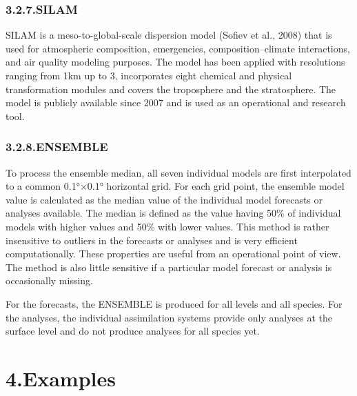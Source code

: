 \documentclass[9pt]{report}
\begin{document}
\subsubsection{3.2.7.\hspace*{0.5em}SILAM}\label{sec-silam}%

\noindent{}SILAM is a meso-to-global-scale dispersion model (Sofiev et al., 2008) that is used for atmospheric composition, emergencies, composition–climate interactions, and air quality modeling purposes. 
The model has been applied with resolutions ranging from 1km up to 3\textdegree{}, incorporates eight chemical and physical transformation modules and covers the troposphere and the stratosphere. 
The model is publicly available since 2007 and is used as an operational and research tool.%

\subsubsection{3.2.8.\hspace*{0.5em}ENSEMBLE}\label{sec-ensemble}%

\noindent{}To process the ensemble median, all seven individual models are first interpolated to a common 0.1°×0.1° horizontal grid. 
For each grid point, the ensemble model value is calculated as the median value of the individual model forecasts or analyses available. 
The median is defined as the value having 50\% of individual models with higher values and 50\% with lower values. 
This method is rather insensitive to outliers in the forecasts or analyses and is very efficient computationally. 
These properties are useful from an operational point of view. 
The method is also little sensitive if a particular model forecast or analysis is occasionally missing.%

 For the forecasts, the ENSEMBLE is produced for all levels and all species. 
 For the analyses, the individual assimilation systems provide only analyses at the surface level and do not produce analyses for all species yet.%

\section{4.\hspace*{0.5em}Examples}\label{sec-examples}%
\end{document}
